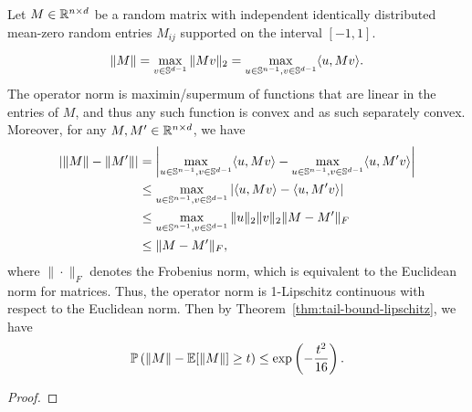 \begin{example}
	Let \(M\in{\mathbb R}^{n\times d}\) be a random matrix with independent identically distributed mean-zero random entries \(M_{ij}\) supported on the interval \([-1,1]\).


	\begin{equation}
		\|M\|=\max_{v\in{\mathbb S}^{d-1}}\|Mv\|_{2}=\max_{u\in{\mathbb S}^{n-1}, v\in{\mathbb S}^{d-1}}\langle u, Mv\rangle.
	\end{equation}
	The operator norm is maximin/supermum of functions that are linear in the entries of \(M\), and thus any such function is convex and as such separately convex.
	Moreover, for any \(M, M'\in{\mathbb R}^{n\times d}\), we have
	\begin{equation*}
		\begin{aligned}
			\left|\|M\|-\|M'\|\right| & =\left|\max_{u\in{\mathbb S}^{n-1}, v\in{\mathbb S}^{d-1}}\langle u, Mv\rangle-\max_{u\in{\mathbb S}^{n-1}, v\in{\mathbb S}^{d-1}}\langle u, M'v\rangle\right| \\
			                          & \leq\max_{u\in{\mathbb S}^{n-1}, v\in{\mathbb S}^{d-1}}\left|\langle u, Mv\rangle-\langle u, M'v\rangle\right|                                   \\
			                          & \leq\max_{u\in{\mathbb S}^{n-1}, v\in{\mathbb S}^{d-1}}\|u\|_{2}\|v\|_{2}\|M-M'\|_{F}                                                            \\
			                          & \leq\|M-M'\|_{F},
		\end{aligned}
	\end{equation*}
	where \(\|\cdot\|_{F}\) denotes the Frobenius norm, which is equivalent to the Euclidean norm for matrices.
	Thus, the operator norm is 1-Lipschitz continuous with respect to the Euclidean norm.
	Then by Theorem~\ref{thm:tail-bound-lipschitz}, we have
	\begin{equation}
		{\mathbb P}\left(\|M\|-{\mathbb E}[\|M\|]\geq t\right)\leq\exp\left(-\frac{t^2}{16}\right).
	\end{equation}
\end{example}

\begin{proof}

\end{proof}

